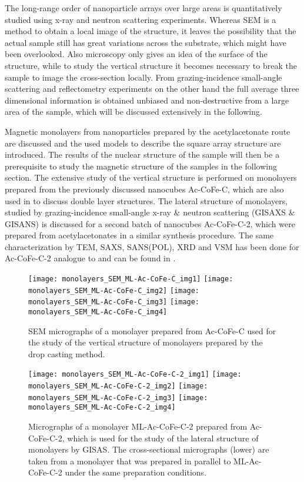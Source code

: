 \documentclass[\main/dresen_thesis.tex]{subfiles}
\begin{document}
  The long-range order of nanoparticle arrays over large areas is quantitatively studied using x-ray and neutron scattering experiments.
  Whereas SEM is a method to obtain a local image of the structure, it leaves the possibility that the actual sample still has great variations across the substrate, which might have been overlooked.
  Also microscopy only gives an idea of the surface of the structure, while to study the vertical structure it becomes necessary to break the sample to image the cross-section locally.
  From grazing-incidence small-angle scattering and reflectometry experiments on the other hand the full average three dimensional information is obtained unbiased and non-destructive from a large area of the sample, which will be discussed extensively in the following.

  Magnetic monolayers from nanoparticles prepared by the acetylacetonate route are discussed and the used models to describe the square array structure are introduced.
  The results of the nuclear structure of the sample will then be a prerequisite to study the magnetic structure of the samples in the following section.
  The extensive study of the vertical structure is performed on monolayers prepared from the previously discussed nanocubes Ac-CoFe-C, which are also used in  to discuss double layer structures.
  The lateral structure of monolayers, studied by grazing-incidence small-angle x-ray \& neutron scattering (GISAXS \& GISANS) is discussed for a second batch of nanocubes Ac-CoFe-C-2, which were prepared from acetylacetonates in a similar synthesis procedure.
  The same characterization by TEM, SAXS, SANS(POL), XRD and VSM has been done for Ac-CoFe-C-2 analogue to  and can be found in .

  \begin{figure}[tb]
    \centering
    \texttt{[image: monolayers\_SEM\_ML-Ac-CoFe-C\_img1]}
    \texttt{[image: monolayers\_SEM\_ML-Ac-CoFe-C\_img2]}
    \texttt{[image: monolayers\_SEM\_ML-Ac-CoFe-C\_img3]}
    \texttt{[image: monolayers\_SEM\_ML-Ac-CoFe-C\_img4]}
    \caption{\label{fig:monolayers:structure:semImagesMLACCoFeC}SEM micrographs of a monolayer prepared from Ac-CoFe-C used for the study of the vertical structure of monolayers prepared by the drop casting method.}
  \end{figure}

  \begin{figure}[tb]
    \centering
    \texttt{[image: monolayers\_SEM\_ML-Ac-CoFe-C-2\_img1]}
    \texttt{[image: monolayers\_SEM\_ML-Ac-CoFe-C-2\_img2]}
    \texttt{[image: monolayers\_SEM\_ML-Ac-CoFe-C-2\_img3]}
    \texttt{[image: monolayers\_SEM\_ML-Ac-CoFe-C-2\_img4]}
    \caption{\label{fig:monolayers:structure:semImagesMLACCoFeC2}Micrographs of a monolayer ML-Ac-CoFe-C-2 prepared from Ac-CoFe-C-2, which is used for the study of the lateral structure of monolayers by GISAS. The cross-sectional micrographs (lower) are taken from a monolayer that was prepared in parallel to ML-Ac-CoFe-C-2 under the same preparation conditions.}
  \end{figure}
\end{document}
